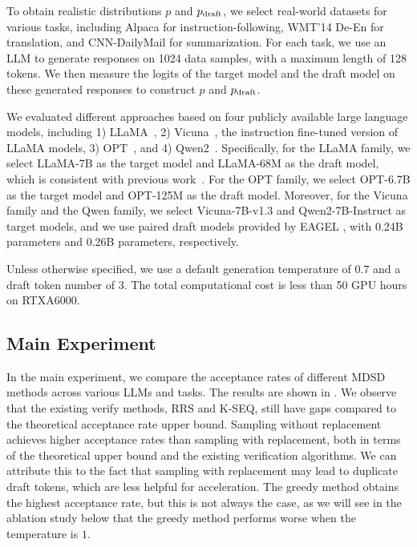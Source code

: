 \documentclass{article}
\makeatletter
\newcommand{\crvspace}{\@ifstar\crvspacestar\crvspacenostar}
\newcommand{\crvspacenostar}[1]{}
\newcommand{\crvspacestar}[1]{}
\makeatother
\begin{document}
To obtain realistic distributions $p$ and $p_{\operatorname{draft}}$, we select real-world datasets for various tasks, including Alpaca \citep{alpaca} for instruction-following, WMT'14 De-En \citep{bojar2014findings} for translation, and CNN-DailyMail \citep{DBLP:conf/nips/HermannKGEKSB15} for summarization. For each task, we use an LLM to generate responses on 1024 data samples, with a maximum length of 128 tokens. We then measure the logits of the target model and the draft model on these generated responses to construct $p$ and $p_{\operatorname{draft}}$.

We evaluated different approaches based on four publicly available large language models, including 1) LLaMA~\citep{touvron2023llama}, 2) Vicuna~\citep{vicuna2023}, the instruction fine-tuned version of LLaMA models, 3) OPT~\citep{zhang2022opt}, and 4) Qwen2~\citep{yang2024qwen2}. Specifically, for the LLaMA family, we select LLaMA-7B as the target model and LLaMA-68M as the draft model, which is consistent with previous work~\citep{miao2024specinfer}. For the OPT family, we select OPT-6.7B as the target model and OPT-125M as the draft model. Moreover, for the Vicuna family and the Qwen family, we select Vicuna-7B-v1.3 and Qwen2-7B-Instruct as target models, and we use paired draft models provided by EAGEL \citep{li2024eagle}, with 0.24B parameters and 0.26B parameters, respectively.

Unless otherwise specified, we use a default generation temperature of $0.7$ and a draft token number of $3$. The total computational cost is less than 50 GPU hours on RTXA6000.

\crvspace{-10pt}
\subsection{Main Experiment}
\crvspace{-5pt}
In the main experiment, we compare the acceptance rates of different MDSD methods across various LLMs and tasks. The results are shown in . We observe that the existing verify methods, RRS and K-SEQ, still have gaps compared to the theoretical acceptance rate upper bound. Sampling without replacement achieves higher acceptance rates than sampling with replacement, both in terms of the theoretical upper bound and the existing verification algorithms. We can attribute this to the fact that sampling with replacement may lead to duplicate draft tokens, which are less helpful for acceleration. The greedy method obtains the highest acceptance rate, but this is not always the case, as we will see in the ablation study below that the greedy method performs worse when the temperature is $1$.
\end{document}
